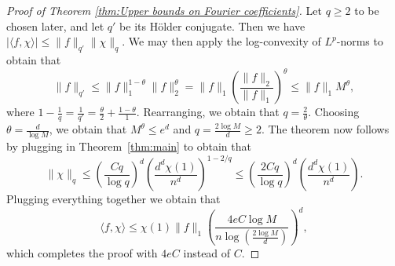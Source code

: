\documentclass[11pt, letterpaper]{amsart}
\newtheorem{thm}{Theorem}[section]
\newcommand{\remove}[1]{}
\renewcommand\ge{\geqslant}
\renewcommand\le{\leqslant}
\begin{document}
\begin{proof}[Proof of Theorem \ref{thm:Upper bounds on Fourier coefficients}]
Let $q \ge 2$ to be chosen later, and let $q'$ be its H\"{o}lder conjugate. Then we have $|\langle f , \chi \rangle|\le \|f\|_{q'}\|\chi\|_q.$ We may then apply the log-convexity of $L^p$-norms to obtain that \[\|f\|_{q'}\le \|f\|_1^{1-\theta}\|f\|_2^{\theta} = \|f\|_1\left(\frac{\|f\|_2}{\|f\|_1}\right)^{\theta} \le \|f\|_1 M^\theta,\] where $1-\frac{1}{q} = \frac{1}{q'} = \frac{\theta}{2} +\frac{1-\theta}{1}.$ Rearranging, we obtain that 
$q=\frac{2}{\theta}.$ Choosing $\theta = \frac{d}{ \log M}$,
we obtain that  
$
M^{\theta} \le e^d
$
and $q=\frac{2 \log M}{d} \ge 2$. The theorem now follows by plugging in Theorem~\ref{thm:main} to obtain that 
\[\|\chi\|_q \le \left(\frac{Cq}{\log q}\right)^d \left( \frac{d^d\chi(1)}{n^d}\right)^{1-2/q}\le \left(\frac{2Cq}{\log q}\right)^d\left( \frac{d^d\chi(1)}{n^d}\right).\]
Plugging everything together we obtain that
\[\langle f, \chi \rangle\le  \chi(1)\|f\|_1\left(\frac{4e C \log M}{n \log \left(\frac{2 \log M}{d}\right)} \right)^d, \]
which completes the proof with $4eC$ instead of $C$. 
\end{proof}


\remove{
When the condition $d \le \frac{\log(\|f\|_2/\|f\|_1)}{4}$ is not satisfied, we still have the following bound:

\begin{thm}
There exists an absolute constant $C>0$, such that the following holds. Let $\chi$ be a character of $S_n$ of level $d \le n/10$ and $d \ge \frac{2\log(\|f\|_2/\|f\|_1)}{3}$. 
 Then 
\[
|\langle f , \chi \rangle| \le  \chi(1)\|f\|_1\left(\frac{Cd}{n} \right)^d. 
\]
\end{thm}
\begin{proof}
Let $q = 3$, and let $q' = \frac{3}{2}$ be its H\"{o}lder conjugate. Then we have $|\langle f , \chi \rangle|\le \|f\|_{q'}\|\chi\|_q.$ We may then apply the log-convexity of $L^p$-norms to obtain that $\|f\|_{q'}\le \|f\|_1^{1-\theta}\|f\|_2^{\theta} = \|f\|_1\left(\frac{\|f\|_2}{\|f\|_1}\right)^{\theta} ,$ where $1-\frac{1}{q} = \frac{1}{q'} = \frac{\theta}{2} +\frac{1-\theta}{1}.$ Rearranging, we obtain that 
$q=\frac{2}{\theta}$, so $\theta=\frac{2}{3}$. Since $\theta \le \frac{d}{\log(\|f\|_2/\|f\|_1)}$, 
we obtain that
$
\left(\frac{\|f\|_2}{\|f\|_1}\right)^{\theta} \le e^d.
$
The theorem now follows by plugging in Theorem~\ref{thm:main} to obtain that
\[\|\chi\|_q \le \left(\frac{Cq}{\log q}\right)^d \left( \frac{d^d\chi(1)}{n^d}\right)^{1-2/q}\le C^d\left( \frac{d^d\chi(1)}{n^d}\right).\]
Plugging everything together we obtain that 
\[\langle f, \chi \rangle\le  \chi(1)\|f\|_1\left(\frac{e Cd}{n} \right)^d, \]
which completes the proof with $eC$ instead of $C$. 
\end{proof}
}
\end{document}
